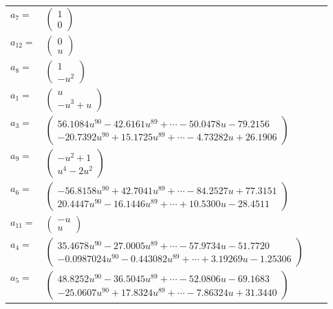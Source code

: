 \documentclass[1p]{elsarticle_modified}
\theoremstyle{definition}
\begin{document}
\begin{tabular}{m{7pt} m{180pt} m{7pt} m{180pt} }
\flushright $a_{7}=$&$\begin{pmatrix}1\\0\end{pmatrix}$ \\
\flushright $a_{12}=$&$\begin{pmatrix}0\\u\end{pmatrix}$ \\
\flushright $a_{8}=$&$\begin{pmatrix}1\\- u^2\end{pmatrix}$ \\
\flushright $a_{1}=$&$\begin{pmatrix}u\\- u^3+u\end{pmatrix}$ \\
\flushright $a_{3}=$&$\begin{pmatrix}56.1084 u^{90}-42.6161 u^{89}+\cdots-50.0478 u-79.2156\\-20.7392 u^{90}+15.1725 u^{89}+\cdots-4.73282 u+26.1906\end{pmatrix}$ \\
\flushright $a_{9}=$&$\begin{pmatrix}- u^2+1\\u^4-2 u^2\end{pmatrix}$ \\
\flushright $a_{6}=$&$\begin{pmatrix}-56.8158 u^{90}+42.7041 u^{89}+\cdots-84.2527 u+77.3151\\20.4447 u^{90}-16.1446 u^{89}+\cdots+10.5300 u-28.4511\end{pmatrix}$ \\
\flushright $a_{11}=$&$\begin{pmatrix}- u\\u\end{pmatrix}$ \\
\flushright $a_{4}=$&$\begin{pmatrix}35.4678 u^{90}-27.0005 u^{89}+\cdots-57.9734 u-51.7720\\-0.0987024 u^{90}-0.443082 u^{89}+\cdots+3.19269 u-1.25306\end{pmatrix}$ \\
\flushright $a_{5}=$&$\begin{pmatrix}48.8252 u^{90}-36.5045 u^{89}+\cdots-52.0806 u-69.1683\\-25.0607 u^{90}+17.8324 u^{89}+\cdots-7.86324 u+31.3440\end{pmatrix}$ \\

\end{tabular}
\end{document}
